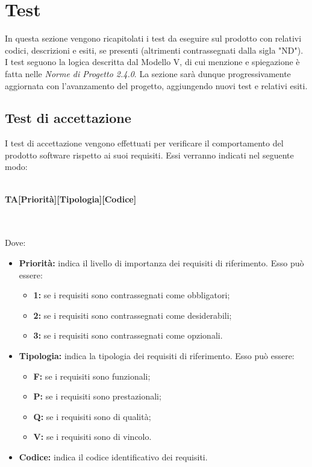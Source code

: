 \section{Test}
In questa sezione vengono ricapitolati i test da eseguire sul prodotto con relativi codici, descrizioni e esiti, se presenti (altrimenti contrassegnati dalla sigla "ND"). I test seguono la logica descritta dal Modello V, di cui menzione e spiegazione è fatta nelle \textit{Norme di Progetto 2.4.0\docs}. La sezione sarà dunque progressivamente aggiornata con l'avanzamento del progetto, aggiungendo nuovi test e relativi esiti.

\subsection{Test di accettazione}
I test di accettazione vengono effettuati per verificare il comportamento del prodotto software rispetto ai suoi requisiti. Essi verranno indicati nel seguente modo:\\\\
\centerline{\textbf{TA[Priorità][Tipologia][Codice]}}\\\\
Dove:
\begin{itemize}
	\item \textbf{Priorità:} indica il livello di importanza dei requisiti di riferimento. Esso può essere:
	\begin{itemize}
		\item \textbf{1:} se i requisiti sono contrassegnati come obbligatori;
		\item \textbf{2:} se i requisiti sono contrassegnati come desiderabili;
		\item \textbf{3:} se i requisiti sono contrassegnati come opzionali.
	\end{itemize}
	\item \textbf{Tipologia:} indica la tipologia dei requisiti di riferimento. Esso può essere:
	\begin{itemize}
		\item \textbf{F:} se i requisiti sono funzionali;
		\item \textbf{P:} se i requisiti sono prestazionali;
		\item \textbf{Q:} se i requisiti sono di qualità;
		\item \textbf{V:} se i requisiti sono di vincolo.
	\end{itemize}
	\item \textbf{Codice:} indica il codice identificativo dei requisiti.
\end{itemize}

